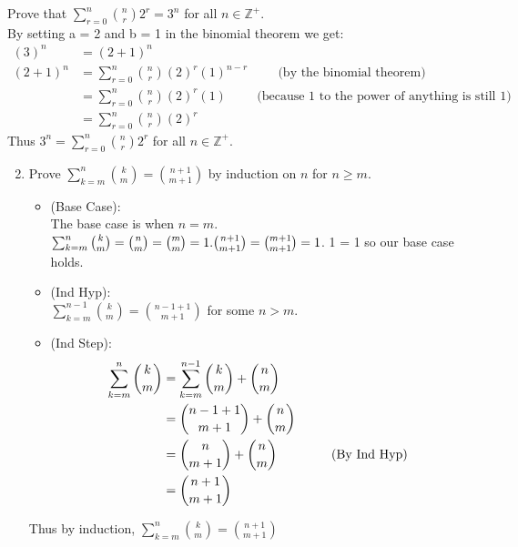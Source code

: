 \documentclass[12pt]{article}
\newcommand{\Z}{\mathbb{Z}}
\newcommand{\be}{\begin{enumerate}}
\newcommand{\ee}{\end{enumerate}}
\newcommand{\setii}[1]{\setcounter{enumii}{#1}}
\begin{document}
\item Prove that $\sum^n_{r=0}{{n\choose r}2^r} = 3^n$ for all $n\in\Z^+$.\\
	By setting a = 2 and b = 1 in the binomial theorem we get:
	\begin{align*}
		(3)^n &= (2+1)^n \\
		(2+1)^n &= \sum^n_{r=0}{n\choose r}(2)^r(1)^{n-r} \hspace{1cm}\text{(by the binomial theorem)}\\
				&= \sum^n_{r=0}{n\choose r}(2)^r(1) \hspace{1cm}\text{(because 1 to the power of anything is still 1)}\\
				&= \sum^n_{r=0}{n\choose r}(2)^r
	\end{align*}
	Thus $3^n = \sum^n_{r=0}{{n\choose r}2^r}$ for all $n\in\Z^+$.

\item 
	\be
	\setii{1}
	\item Prove $\sum^n_{k=m}{k\choose m} = {{n+1}\choose{m+1}}$ by induction on $n$ for $n\geq m$.	\\
	\begin{itemize}
		\item (Base Case): \vspace{0.1cm} \\
			The base case is when $n=m$. $\sum^n_{k=m}{k\choose m} = {n\choose m} = {m\choose m} = 1. \\
			{{n+1}\choose{m+1}} = {{m+1}\choose{m+1}} = 1$. 1 = 1 so our base case holds.
		
		\item (Ind Hyp):\vspace{0.1cm} \\ 
			$\sum^{n-1}_{k=m}{k\choose m} = {{n-1+1}\choose{m+1}}$ for some $n>m$.

		\item (Ind Step):
		\begin{align}
			\sum^{n}_{k=m}{k\choose m} &= \sum^{n-1}_{k=m}{k\choose m} + {n\choose m}\\
									&= {{n-1+1}\choose{m+1}} + {n\choose m} \\
									&= {{n}\choose{m+1}} + {n\choose m} \hspace{1.5cm}\text{(By Ind Hyp)}\\
									&= {{n+1}\choose{m+1}}
		\end{align}
	\end{itemize}
		Thus by induction, $\sum^n_{k=m}{k\choose m} = {{n+1}\choose{m+1}}$
	\ee
 
\end{document}
